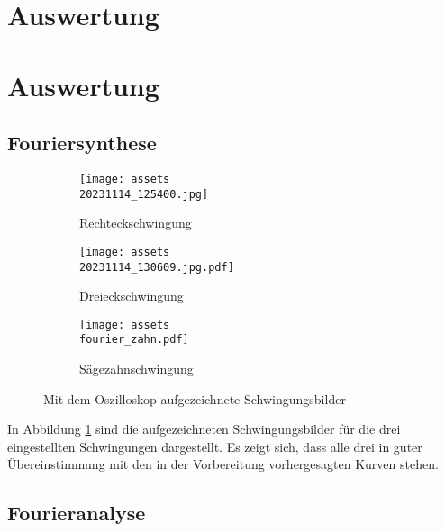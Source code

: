 \section{Auswertung}
\label{sec:Auswertung}

\section{Auswertung}
\subsection{Fouriersynthese}
\begin{figure}
\begin{subfigure}{0.5\textwidth}
    \centering
    \texttt{[image: assets\\20231114\_125400.jpg]}
    \caption{Rechteckschwingung}
\end{subfigure}
\begin{subfigure}{0.5\textwidth}
    \centering
    \texttt{[image: assets\\20231114\_130609.jpg.pdf]}
    \caption{Dreieckschwingung}
\end{subfigure}
\begin{subfigure}{0.5\textwidth}
    \centering
    \texttt{[image: assets\\fourier\_zahn.pdf]}
    \caption{Sägezahnschwingung}
\end{subfigure}
\caption{Mit dem Oszilloskop aufgezeichnete Schwingungsbilder}
\label{fig:oszi}
\end{figure}

In Abbildung \ref{fig:oszi} sind die aufgezeichneten Schwingungsbilder für die drei eingestellten Schwingungen dargestellt. Es zeigt sich, dass alle drei in guter Übereinstimmung mit den in der Vorbereitung vorhergesagten Kurven stehen.

\subsection{Fourieranalyse}
